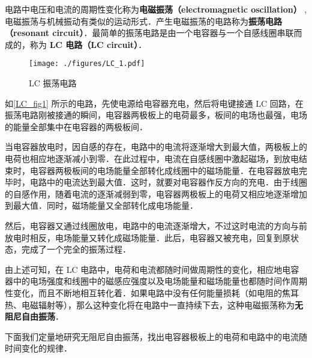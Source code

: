 

电路中电压和电流的周期性变化称为\textbf{电磁振荡（electromagnetic oscillation）} , 电磁振荡与机械振动有类似的运动形式．产生电磁振荡的电路称为\textbf{振荡电路（resonant circuit）}．最简单的振荡电路是由一个电容器与一个自感线圈串联而成的，称为\textbf{ LC 电路（LC circuit）}．
\begin{figure}[ht]
\centering
\texttt{[image: ./figures/LC\_1.pdf]}
\caption{LC 振荡电路} \label{LC_fig1}
\end{figure}

如\autoref{LC_fig1} 所示的电路，先使电源给电容器充电，然后将电键接通 LC 回路，在振荡电路刚被接通的瞬间，电容器两极板上的电荷最多，板间的电场也最强，电场的能量全部集中在电容器的两极板间．

当电容器放电时，因自感的存在，电路中的电流将逐渐增大到最大值，两极板上的电荷也相应地逐渐减小到零．在此过程中，电流在自感线圈中激起磁场，到放电结束时，电容器两极板间的电场能量全部转化成线圈中的磁场能量．在电容器放电完毕时，电路中的电流达到最大值．这时，就要对电容器作反方向的充电．由于线圈的自感作用，随着电流的逐渐减弱到零，电容器两极板上的电荷又相应地逐渐增加到最大值．同时，磁场能量又全部转化成电场能量．

然后，电容器又通过线圈放电，电路中的电流逐渐增大，不过这时电流的方向与前放电时相反，电场能量又转化成磁场能量．此后，电容器又被充电，回复到原状态，完成了一个完全的振荡过程．

由上述可知，在 LC 电路中，电荷和电流都随时间做周期性的变化，相应地电容器中的电场强度和线圈中的磁感应强度以及电场能量和磁场能量也都随时间作周期性变化，而且不断地相互转化着．如果电路中没有任何能量损耗（如电阻的焦耳热、电磁辐射等），那么这种变化将在电路中一直持续下去，这种电磁振荡称为\textbf{无阻尼自由振荡}．

下面我们定量地研究无阻尼自由振荡，找出电容器极板上的电荷和电路中的电流随时间变化的规律．

